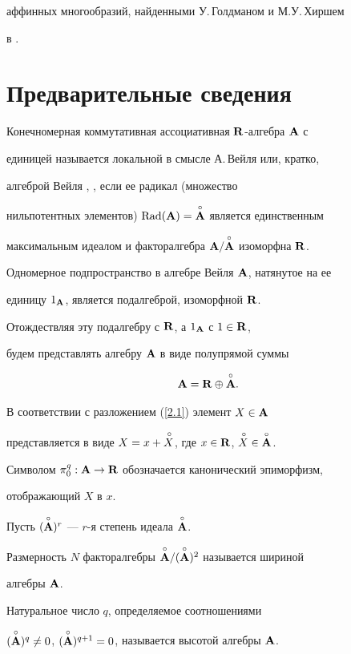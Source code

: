 аффинных многообразий, найденными У.\,Голдманом и М.У.\,Хиршем


в \cite{G-H}.








\section{Предварительные сведения}





Конечномерная коммутативная ассоциативная ${\bold R}$-алгебра ${\bold A}$ с


единицей называется локальной в смысле А.\,Вейля или, кратко,


алгеброй Вейля \cite{Weil}, \cite{KMS}, если ее радикал (множество


нильпотентных элементов) $\operatorname{Rad}({\bold A})=\overset{\circ}{\bold A}{}$ является единственным


максимальным идеалом и факторалгебра ${\bold A}/{\overset{\circ}{\bold A}{}}$ изоморфна ${\bold R}$.


Одномерное подпространство в алгебре Вейля ${\bold A}$, натянутое на ее


единицу $1_{\bold A}$, является подалгеброй, изоморфной ${\bold R}$.


Отождествляя эту подалгебру с  ${\bold R}$, а  $1_{\bold A}$ с  $1\in{\bold R}$,


будем представлять алгебру  ${\bold A}$ в виде полупрямой суммы


\begin{equation}


\A=\R\oplus{\Ao}. \label{2.1}


\end{equation}


В соответствии с разложением (\ref{2.1}) элемент $X\in{\bold A}$


представляется в виде $X=x+{\overset{\,\circ}{X}{}}$, где $x\in{\bold R}$, $\overset{\,\circ}{X}{}\in\overset{\circ}{\bold A}{}$.


Символом ${\pi^q_0}:{\bold A}\to{\bold R}$ обозначается канонический эпиморфизм,


отображающий  $X$ в $x$.


Пусть  $(\overset{\circ}{\bold A}{})^r$  ---  $r$-я степень идеала $\overset{\circ}{\bold A}{}$.


Размерность $N$ факторалгебры ${\overset{\circ}{\bold A}{}}/({\overset{\circ}{\bold A}{}})^2$ называется шириной


алгебры  ${\bold A}$.


Натуральное число $q$, определяемое соотношениями


$(\overset{\circ}{\bold A}{})^q\ne 0$, $(\overset{\circ}{\bold A}{})^{q+1}=0$, называется высотой алгебры  ${\bold A}$.


